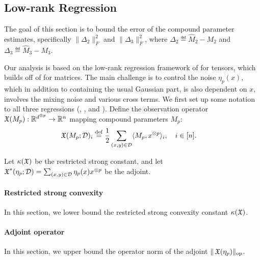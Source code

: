 \subsection{Low-rank Regression}
\label{sec:regression}

The goal of this section is to bound the error of
the compound parameter estimates,
specifically $\|\Delta_2\|_F^2$ and $\|\Delta_3\|_F^2$,
where $\Delta_2 \eqdef \hat M_2 - M_2$
and $\Delta_3 \eqdef \hat M_3 - M_3$.

Our analysis is based on the low-rank regression framework of
\citet{Tomioka2011} for tensors, which builds off of
\citet{NegahbanWainwright2009} for matrices.
The main challenge is to control the noise $\eta_p(x)$,
which in addition to containing the usual Gaussian part, is also dependent on
$x$, involves the mixing noise and various cross terms.
We first set up some notation to all three regressions (, , and ).
Define the observation operator $\operatorname{\mathfrak{X}}(M_p) : \mathbb{R}^{d^{\otimes p}} \to \mathbb{R}^{n}$
mapping compound parameters $M_p$:
\begin{align}
  \operatorname{\mathfrak{X}}(M_p; \mathcal{D})_i &\stackrel{\rm def}{=} \frac12 \sum_{(x,y) \in \mathcal{D}} \langle M_p, x^{\otimes p} \rangle_i, \quad i  \in [n].
\end{align}

Let $\kappa(\operatorname{\mathfrak{X}})$ be the restricted strong constant,
and let $\operatorname{\mathfrak{X}}^*(\eta_p; \mathcal{D}) = \sum_{(x,y) \in \mathcal{D}} \eta_p(x) x^{\otimes p}$
be the adjoint.

\paragraph{Restricted strong convexity}

In this section, we lower bound the restricted strong convexity constant
$\kappa(\operatorname{\mathfrak{X}})$.

\paragraph{Adjoint operator}

In this section, we upper bound the operator norm of the adjoint
$\|\operatorname{\mathfrak{X}}(\eta_p)\|_\text{op}$.




